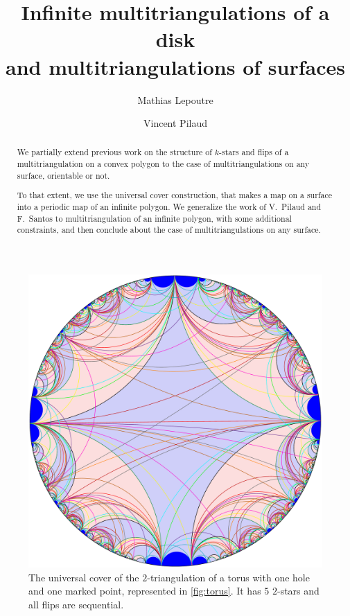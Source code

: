 \documentclass{amsart}
\title[Infinite multitriangulations of a disk and multitriangulations of surfaces]{Infinite multitriangulations of a disk \\ and multitriangulations of surfaces}
\author{Mathias Lepoutre}
\author{Vincent Pilaud}
\theoremstyle{remark}
\begin{document}
\begin{abstract}
We partially extend previous work on the structure of $k$-stars and flips of a multitriangulation on a convex polygon to the case of multitriangulations on any surface, orientable or not. 

To that extent, we use the universal cover construction, that makes a map on a surface into a periodic map of an infinite polygon. We generalize the work of V.~Pilaud and F.~Santos to multitriangulation of an infinite polygon, with some additional constraints, and then conclude about the case of multitriangulations on any surface.
\end{abstract}

\maketitle

\begin{figure}[h]
	\capstart
	\centerline{\includegraphics[scale=.42]{torus}}
	\caption{The universal cover of the $2$-triangulation of a torus with one hole and one marked point, represented in \cref{fig:torus}. It has $5$ $2$-stars and all flips are sequential.}
	\label{fig:UCtorus}
\end{figure}

\end{document}
